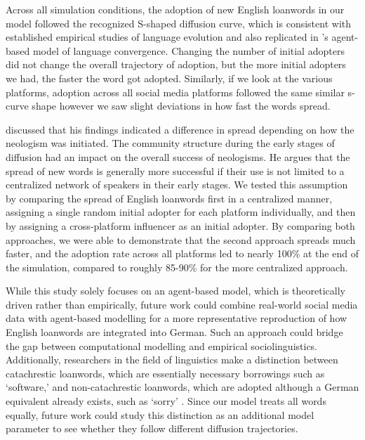 \documentclass[12pt]{article}
\begin{document}
Across all simulation conditions, the adoption of new English loanwords in our model followed the recognized S-shaped diffusion curve, which is consistent with established empirical studies of language evolution \parencite{nevalainen2015} and also replicated in \citeauthor{baronchelli2006}'s \parencite*{baronchelli2006} agent-based model of language convergence. Changing the number of initial adopters did not change the overall trajectory of adoption, but the more initial adopters we had, the faster the word got adopted. Similarly, if we look at the various platforms, adoption across all social media platforms followed the same similar s-curve shape however we saw slight deviations in how fast the words spread.

\textcite{wuerschinger2021} discussed that his findings indicated a difference in spread depending on how the neologism was initiated. The community structure during the early stages of diffusion had an impact on the overall success of neologisms. He argues that the spread of new words is generally more successful if their use is not limited to a centralized network of speakers in their early stages. We tested this assumption by comparing the spread of English loanwords first in a centralized manner, assigning a single random initial adopter for each platform individually, and then by assigning a cross-platform influencer as an initial adopter. By comparing both approaches, we were able to demonstrate that the second approach spreads much faster, and the adoption rate across all platforms led to nearly 100\% at the end of the simulation, compared to roughly 85-90\% for the more centralized approach. 

While this study solely focuses on an agent-based model, which is theoretically driven rather than empirically, future work could combine real-world social media data with agent-based modelling for a more representative reproduction of how English loanwords are integrated into German. Such an approach could bridge the gap between computational modelling and empirical sociolinguistics.
Additionally, researchers in the field of linguistics make a distinction between catachrestic loanwords, which are essentially necessary borrowings such as ‘software,’ and non-catachrestic loanwords, which are adopted although a German equivalent already exists, such as ‘sorry’ \parencite{onysko2011}. Since our model treats all words equally, future work could study this distinction as an additional model parameter to see whether they follow different diffusion trajectories.
\end{document}
